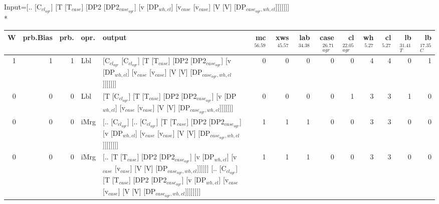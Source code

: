 \begingroup\scriptsize Input=[.. [C$_{cl_{agr}}$] [T [T$_{case}$] [DP2 [DP2$_{case_{agr}}$] [v [DP$_{wh,cl}$] [v$_{case}$ [v$_{case}$] [V [V] [DP$_{case_{agr},wh,cl}$]]]]]]]\\*
\begin{tabularx}{\linewidth}{rrrlXrrrrrrrrr}
\hline
   W &   prb.Bias &   prb. & opr.   & output                                                                                                                                                                                                             &   mc$^{56.59}$ &   xws$^{45.57}$ &   lab$^{34.38}$ &   case$_{agr}^{26.71}$ &   cl$_{agr}^{22.05}$ &   wh$^{5.27}$ &   cl$^{5.27}$ &   lb$_{T}^{31.41}$ &   lb$_{C}^{17.35}$ \\
\hline
   1 &       1 &   1 & Lbl  & [C$_{cl_{agr}}$ [C$_{cl_{agr}}$] [T [T$_{case}$] [DP2 [DP2$_{case_{agr}}$] [v [DP$_{wh,cl}$] [v$_{case}$ [v$_{case}$] [V [V] [DP$_{case_{agr},wh,cl}$]]]]]]]                                                                                               &            0 &             0 &             0 &                  0 &                0 &           4 &           4 &              0 &              1 \\
   0 &       0 &   0 & Lbl  & [T [C$_{cl_{agr}}$] [T [T$_{case}$] [DP2 [DP2$_{case_{agr}}$] [v [DP$_{wh,cl}$] [v$_{case}$ [v$_{case}$] [V [V] [DP$_{case_{agr},wh,cl}$]]]]]]]                                                                                                      &            0 &             0 &             0 &                  0 &                1 &           3 &           3 &              1 &              0 \\
   0 &       0 &   0 & iMrg & [.. [C$_{cl_{agr}}$] [.. [C$_{cl_{agr}}$] [T [T$_{case}$] [DP2 [DP2$_{case_{agr}}$] [v [DP$_{wh,cl}$] [v$_{case}$ [v$_{case}$] [V [V] [DP$_{case_{agr},wh,cl}$]]]]]]]]                                                                                     &            1 &             1 &             1 &                  0 &                0 &           3 &           3 &              0 &              0 \\
   0 &       0 &   0 & iMrg & [.. [T [T$_{case}$] [DP2 [DP2$_{case_{agr}}$] [v [DP$_{wh,cl}$] [v$_{case}$ [v$_{case}$] [V [V] [DP$_{case_{agr},wh,cl}$]]]]]] [.. [C$_{cl_{agr}}$] [T [T$_{case}$] [DP2 [DP2$_{case_{agr}}$] [v [DP$_{wh,cl}$] [v$_{case}$ [v$_{case}$] [V [V] [DP$_{case_{agr},wh,cl}$]]]]]]]] &            1 &             1 &             1 &                  0 &                0 &           3 &           3 &              0 &              0 \\

\end{tabularx}
